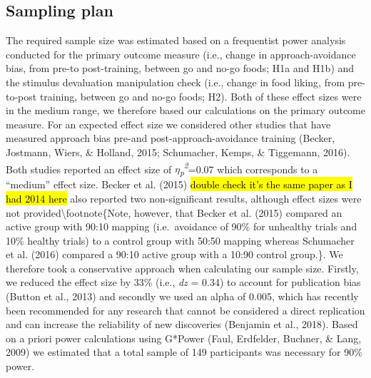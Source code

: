 \documentclass[man,floatsintext]{apa6}
\begin{document}
\hypertarget{sampling}{%
\subsection{Sampling plan}\label{sampling}}

\par

The required sample size was estimated based on a frequentist power analysis conducted for the primary outcome measure (i.e., change in approach-avoidance bias, from pre-to post-training, between go and no-go foods; H1a and H1b) and the stimulus devaluation manipulation check (i.e., change in food liking, from pre-to-post training, between go and no-go foods; H2). Both of these effect sizes were in the medium range, we therefore based our calculations on the primary outcome measure. For an expected effect size we considered other studies that have measured approach bias pre-and post-approach-avoidance training (Becker, Jostmann, Wiers, \& Holland, 2015; Schumacher, Kemps, \& Tiggemann, 2016). Both studies reported an effect size of \textit{$\eta$\textsubscript{p}\textsuperscript{2}}=0.07 which corresponds to a \enquote{medium} effect size. Becker et al. (2015) \hl{double check it's the same paper as I had 2014 here} also reported two non-significant results, although effect sizes were not provided\textbackslash footnote\{Note, however, that Becker et al. (2015) compared an active group with 90:10 mapping (i.e.~avoidance of 90\% for unhealthy trials and 10\% healthy trials) to a control group with 50:50 mapping whereas Schumacher et al. (2016) compared a 90:10 active group with a 10:90 control group.\}. We therefore took a conservative approach when calculating our sample size. Firstly, we reduced the effect size by 33\% (i.e., \textit{dz} = 0.34) to account for publication bias (Button et al., 2013) and secondly we used an alpha of 0.005, which has recently been recommended for any research that cannot be considered a direct replication and can increase the reliability of new discoveries (Benjamin et al., 2018). Based on a priori power calculations using G*Power (Faul, Erdfelder, Buchner, \& Lang, 2009) we estimated that a total sample of 149 participants was necessary for 90\% power.

\par
\end{document}
